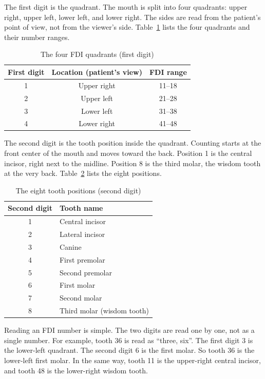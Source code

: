 \documentclass[a4paper,12pt]{report}
\begin{document}
The first digit is the quadrant. The mouth is split into four quadrants: upper right, upper left, lower left, and lower right. The sides are read from the patient's point of view, not from the viewer's side. Table~\ref{tab:fdi-quadrant} lists the four quadrants and their number ranges.

\begin{table}[H]
\centering
\caption{The four FDI quadrants (first digit)}
\label{tab:fdi-quadrant}
\begin{tabular}{ccc}
\toprule
First digit & Location (patient's view) & FDI range \\
\midrule
1 & Upper right & 11--18 \\
2 & Upper left  & 21--28 \\
3 & Lower left  & 31--38 \\
4 & Lower right & 41--48 \\
\bottomrule
\end{tabular}
\end{table}

The second digit is the tooth position inside the quadrant. Counting starts at the front center of the mouth and moves toward the back. Position 1 is the central incisor, right next to the midline. Position 8 is the third molar, the wisdom tooth at the very back. Table~\ref{tab:fdi-position} lists the eight positions.

\begin{table}[H]
\centering
\caption{The eight tooth positions (second digit)}
\label{tab:fdi-position}
\begin{tabular}{cl}
\toprule
Second digit & Tooth name \\
\midrule
1 & Central incisor \\
2 & Lateral incisor \\
3 & Canine \\
4 & First premolar \\
5 & Second premolar \\
6 & First molar \\
7 & Second molar \\
8 & Third molar (wisdom tooth) \\
\bottomrule
\end{tabular}
\end{table}

Reading an FDI number is simple. The two digits are read one by one, not as a single number. For example, tooth 36 is read as ``three, six''. The first digit 3 is the lower-left quadrant. The second digit 6 is the first molar. So tooth 36 is the lower-left first molar. In the same way, tooth 11 is the upper-right central incisor, and tooth 48 is the lower-right wisdom tooth.
\end{document}
